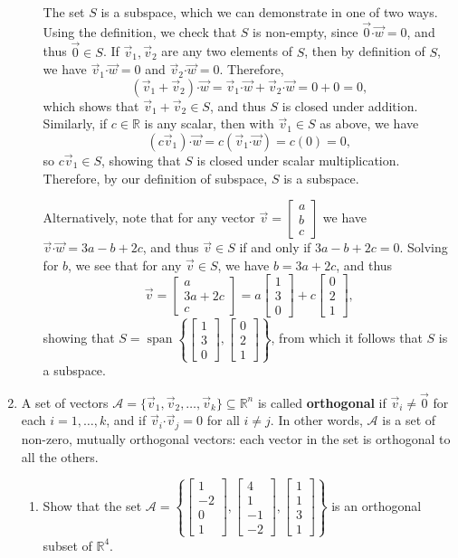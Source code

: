 \documentclass[letterpaper,12pt]{article}
\newcommand{\R}{\mathbb{R}}
\newcommand{\dotp}{\boldsymbol{\cdot}}
\newcommand{\bbm}{\begin{bmatrix}}
\newcommand{\ebm}{\end{bmatrix}}
\begin{document}
\begin{enumerate}
\begin{enumerate}
\bigskip

The set $S$ is a subspace, which we can demonstrate in one of two ways. Using the definition, we check that $S$ is non-empty, since $\vec{0}\dotp \vec{w} = 0$, and thus $\vec{0}\in S$. If $\vec{v}_1,\vec{v}_2$ are any two elements of $S$, then by definition of $S$, we have $\vec{v}_1\dotp\vec{w}=0$ and $\vec{v}_2\dotp\vec{w}=0$. Therefore,
\[
 (\vec{v}_1+\vec{v}_2)\dotp \vec{w} = \vec{v}_1\dotp\vec{w} + \vec{v}_2\dotp \vec{w} = 0+0=0,
\]
which shows that $\vec{v}_1+\vec{v}_2\in S$, and thus $S$ is closed under addition. Similarly, if $c\in\R$ is any scalar, then with $\vec{v}_1\in S$ as above, we have
\[
 (c\vec{v}_1)\dotp \vec{w} = c(\vec{v}_1\dotp \vec{w}) = c(0)=0,
\]
so $c\vec{v}_1\in S$, showing that $S$ is closed under scalar multiplication. Therefore, by our definition of subspace, $S$ is a subspace.

\medskip

Alternatively, note that for any vector $\vec{v} = \bbm a\\b\\c\ebm$ we have $\vec{v}\dotp\vec{w} = 3a-b+2c$, and thus $\vec{v}\in S$ if and only if $3a-b+2c=0$. Solving for $b$, we see that for any $\vec{v}\in S$, we have $b=3a+2c$, and thus
\[
 \vec{v} = \bbm a\\3a+2c\\c\ebm = a\bbm 1\\3\\0\ebm + c\bbm 0\\2\\1\ebm,
\]
showing that $S = \operatorname{span}\left\{\bbm 1\\3\\0\ebm,\bbm 0\\2\\1\ebm\right\}$, from which it follows that $S$ is a subspace.
\end{enumerate}

\bigskip

\item A set of vectors $\mathcal{A} = \{\vec{v}_1, \vec{v}_2, \ldots, \vec{v}_k\}\subseteq \R^n$ is called \textbf{orthogonal} if $\vec{v}_i \neq \vec{0}$ for each $i=1,\ldots, k$, and if $\vec{v}_i\dotp \vec{v}_j = 0$ for all $i\neq j$. In other words, $\mathcal{A}$ is a set of non-zero, mutually orthogonal vectors: each vector in the set is orthogonal to all the others.

\begin{enumerate}
 \item Show that the set $\mathcal{A} = \left\{\bbm 1\\-2\\0\\1\ebm, \bbm 4\\1\\-1\\-2\ebm, \bbm 1\\1\\3\\1\ebm\right\}$ is an orthogonal subset of $\R^4$.


\end{enumerate}
\end{enumerate}
\end{document}
